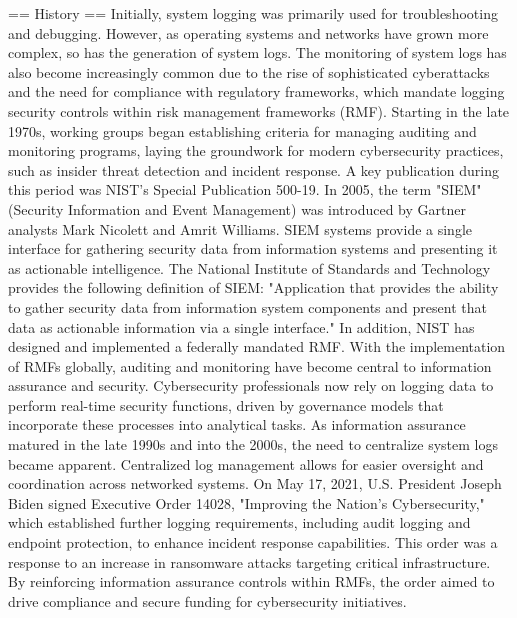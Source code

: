 == History ==
Initially, system logging was primarily used for troubleshooting and debugging. However, as operating systems and networks have grown more complex, so has the generation of system logs. The monitoring of system logs has also become increasingly common due to the rise of sophisticated cyberattacks and the need for compliance with regulatory frameworks, which mandate logging security controls within risk management frameworks (RMF). 
Starting in the late 1970s, working groups began establishing criteria for managing auditing and monitoring programs, laying the groundwork for modern cybersecurity practices, such as insider threat detection and incident response. A key publication during this period was NIST’s Special Publication 500-19.
In 2005, the term "SIEM" (Security Information and Event Management) was introduced by Gartner analysts Mark Nicolett and Amrit Williams. SIEM systems provide a single interface for gathering security data from information systems and presenting it as actionable intelligence. The National Institute of Standards and Technology provides the following definition of SIEM: "Application that provides the ability to gather security data from information system components and present that data as actionable information via a single interface." In addition, NIST has designed and implemented a federally mandated RMF.
With the implementation of RMFs globally, auditing and monitoring have become central to information assurance and security. Cybersecurity professionals now rely on logging data to perform real-time security functions, driven by governance models that incorporate these processes into analytical tasks. As information assurance matured in the late 1990s and into the 2000s, the need to centralize system logs became apparent. Centralized log management allows for easier oversight and coordination across networked systems.
On May 17, 2021, U.S. President Joseph Biden signed Executive Order 14028, "Improving the Nation's Cybersecurity," which established further logging requirements, including audit logging and endpoint protection, to enhance incident response capabilities. This order was a response to an increase in ransomware attacks targeting critical infrastructure. By reinforcing information assurance controls within RMFs, the order aimed to drive compliance and secure funding for cybersecurity initiatives.


